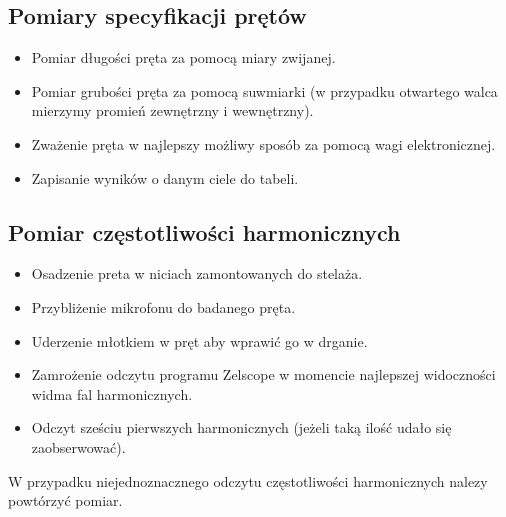 \documentclass[a4paper,12pts]{article}
\begin{document}
\subsection{Pomiary specyfikacji prętów}
\begin{itemize}
	\item Pomiar długości pręta za pomocą miary zwijanej.
	\item Pomiar grubości pręta za pomocą suwmiarki (w przypadku otwartego walca mierzymy promień zewnętrzny i wewnętrzny).
	\item Zważenie pręta w najlepszy możliwy sposób za pomocą wagi elektronicznej.
	\item Zapisanie wyników o danym ciele do tabeli.
\end{itemize}

\subsection{Pomiar częstotliwości harmonicznych}
\begin{itemize}
	\item Osadzenie preta w niciach zamontowanych do stelaża.
	\item Przybliżenie mikrofonu do badanego pręta.
	\item Uderzenie młotkiem w pręt aby wprawić go w drganie.
	\item Zamrożenie odczytu programu Zelscope w momencie najlepszej widoczności widma fal harmonicznych.
	\item Odczyt sześciu pierwszych harmonicznych (jeżeli taką ilość udało się zaobserwować).
\end{itemize}
W przypadku niejednoznacznego odczytu częstotliwości harmonicznych nalezy powtórzyć pomiar.

\newpage
\end{document}
